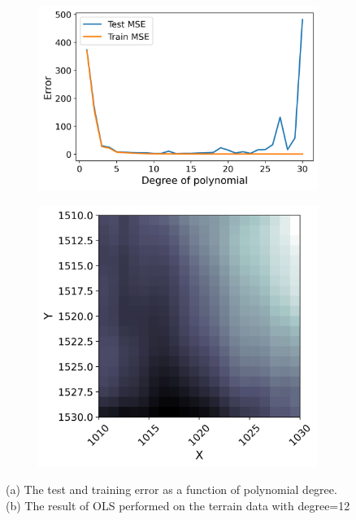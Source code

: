 \documentclass[../main.tex]{subfiles}
\begin{document}
\begin{figure}[H] 
   \centering
   \begin{subfigure}[b]{0.51\textwidth}
      \centering
    \includegraphics[width=\textwidth]{../assets/terrain_ols_error_plot.png}
    \caption{}
    \label{fig:test-train-error}
   \end{subfigure}
   \quad
   \begin{subfigure}[b]{0.45\textwidth}
    \centering
    \includegraphics[width=\textwidth]{../assets/Terrain_OLS_bestdegree_newnew.png} 
    \caption{}
    \label{fig:OLS-estimate}
   \end{subfigure}
   \caption{(a) The test and training error as a function of polynomial degree. (b) The result of OLS performed on the terrain data with degree=12
   }
   \label{fig:terrain-OLS}
\end{figure} 
\end{document}
